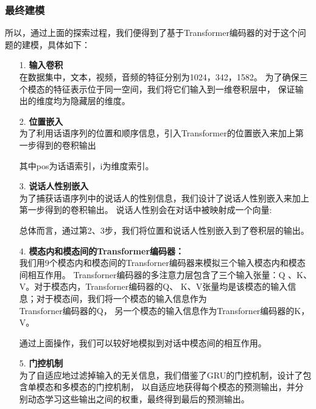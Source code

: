 \documentclass[11pt]{article}
\begin{document}
            \subsubsection{最终建模}
            所以，通过上面的探索过程，我们便得到了基于Transformer编码器的对于这个问题的建模，具体如下：
            \begin{enumerate}
                \item [1. ]\textbf{输入卷积}\\
                在数据集中，文本，视频，音频的特征分别为1024，342，1582。
                为了确保三个模态的特征表示位于同一空间，我们将它们输入到一维卷积层中，
                保证输出的维度均为隐藏层的维度。
                
                \item [2. ]\textbf{位置嵌入}\\
                为了利用话语序列的位置和顺序信息，引入Transformer的位置嵌入来加上第一步得到的卷积输出

                其中pos为话语索引，i为维度索引。
                
                \item [3. ]\textbf{说话人性别嵌入}\\
                为了捕获话语序列中的说话人的性别信息，我们设计了说话人性别嵌入来加上第一步得到的卷积输出。
                说话人性别会在对话中被映射成一个向量:
                
                总体而言，通过第2、3步，我们将位置和说话人性别嵌入到了卷积层的输出。
                
                \item [4. ]\textbf{模态内和模态间的Transformer编码器：}\\
                我们用9个模态内和模态间的Transforner编码器来模拟三个输入模态内和模态间相互作用。
                Transforner编码器的多注意力层包含了三个输入张量：Q 、K、 V。对于模态内，Transforner编码器的Q、
                K、V张量均是该模态的输入信息；对于模态间，我们将一个模态的输入信息作为\\Transforner编码器的Q，
                另一个模态的输入信息作为Transforner编码器的K，V。

                通过上面操作，我们可以较好地模拟到对话中模态间的相互作用。
                
                \item [5. ]\textbf{门控机制}\\
                为了自适应地过滤掉输入的无关信息，我们借鉴了GRU的门控机制，设计了包含单模态和多模态的门控机制，
                以自适应地获得每个模态的预测输出，并分别动态学习这些输出之间的权重，最终得到最后的预测输出。
                

\end{enumerate}
\end{document}
